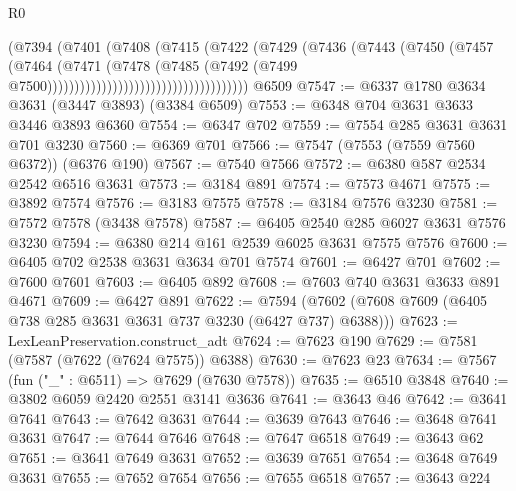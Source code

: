 \begin{lexlean}{R0}
\begin{coremodule}
                                              (@7394
                                                (@7401
                                                  (@7408
                                                    (@7415
                                                      (@7422
                                                        (@7429
                                                          (@7436
                                                            (@7443
                                                              (@7450
                                                                (@7457
                                                                  (@7464
                                                                    (@7471
                                                                      (@7478
                                                                        (@7485
                                                                          (@7492
                                                                            (@7499
                                                                              @7500)))))))))))))))))))))))))))))))))))))
    @6509
@7547 := @6337 @1780 @3634 @3631 (@3447 @3893) (@3384 @6509)
@7553 := @6348 @704 @3631 @3633 @3446 @3893 @6360
@7554 := @6347 @702
@7559 := @7554 @285 @3631 @3631 @701 @3230
@7560 := @6369 @701
@7566 := @7547 (@7553 (@7559 @7560 @6372)) (@6376 @190)
@7567 := @7540 @7566
@7572 := @6380 @587 @2534 @2542 @6516 @3631
@7573 := @3184 @891
@7574 := @7573 @4671
@7575 := @3892 @7574
@7576 := @3183 @7575
@7578 := @3184 @7576 @3230
@7581 := @7572 @7578 (@3438 @7578)
@7587 := @6405 @2540 @285 @6027 @3631 @7576 @3230
@7594 := @6380 @214 @161 @2539 @6025 @3631 @7575 @7576
@7600 := @6405 @702 @2538 @3631 @3634 @701 @7574
@7601 := @6427 @701
@7602 := @7600 @7601
@7603 := @6405 @892
@7608 := @7603 @740 @3631 @3633 @891 @4671
@7609 := @6427 @891
@7622 := @7594 (@7602 (@7608 @7609 (@6405 @738 @285 @3631 @3631 @737 @3230 (@6427 @737) @6388)))
@7623 := LexLeanPreservation.construct_adt
@7624 := @7623 @190
@7629 := @7581 (@7587 (@7622 (@7624 @7575)) @6388)
@7630 := @7623 @23
@7634 := @7567 (fun ("_" : @6511) => @7629 (@7630 @7578))
@7635 := @6510 @3848
@7640 := @3802 @6059 @2420 @2551 @3141 @3636
@7641 := @3643 @46
@7642 := @3641 @7641
@7643 := @7642 @3631
@7644 := @3639 @7643
@7646 := @3648 @7641 @3631
@7647 := @7644 @7646
@7648 := @7647 @6518
@7649 := @3643 @62
@7651 := @3641 @7649 @3631
@7652 := @3639 @7651
@7654 := @3648 @7649 @3631
@7655 := @7652 @7654
@7656 := @7655 @6518
@7657 := @3643 @224

\end{coremodule}
\end{lexlean}

